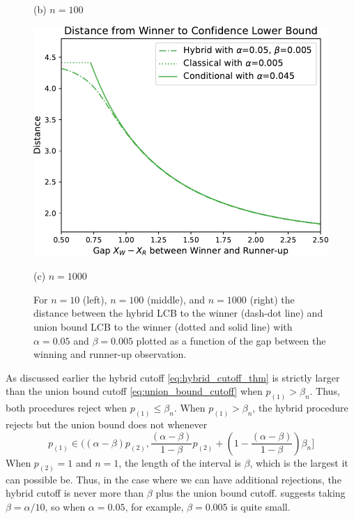 \documentclass{article}
\begin{document}
\begin{appendix}
\begin{figure}
\begin{minipage}{0.32\textwidth}
        \caption*{(b) $n=100$}
    \end{minipage}
    \hfill
    \hspace{0.01\textwidth}
    \begin{minipage}{0.32\textwidth}
        \centering
        \includegraphics[width=\textwidth]{fig/hyb_dist_to_winner_n=1000.pdf}
        \caption*{(c) $n=1000$}
    \end{minipage}
    \caption{ For $n=10$ (left), $n=100$ (middle), and $n=1000$ (right) the distance between the hybrid LCB to the winner (dash-dot line) and union bound LCB to the winner (dotted and solid line) with $\alpha=0.05$ and $\beta=0.005$ plotted as a function of the gap between the winning and runner-up observation.}
    \label{fig:hybrid_union}
\end{figure}

As discussed earlier the hybrid cutoff \eqref{eq:hybrid_cutoff_thm} is strictly larger than the union bound cutoff \eqref{eq:union_bound_cutoff} when $p_{(1)} > \beta_n$. Thus, both procedures reject when $p_{(1)} \leq \beta_n$. When $p_{(1)} > \beta_n$, the hybrid procedure rejects but the union bound does not whenever  
\begin{equation*}
    p_{(1)} \in \bigg((\alpha - \beta)p_{(2)},  \frac{(\alpha - \beta)}{1-\beta}p_{(2)} + \left(1 -  \frac{(\alpha - \beta)}{1-\beta}\right)\beta_n \bigg]
\end{equation*}
When $p_{(2)} = 1$ and $n=1$, the length of the interval is $\beta$, which is the largest it can possible be. Thus, in the case where we can have additional rejections, the hybrid cutoff is never more than $\beta$ plus the union bound cutoff. \cite{Andrews2023} suggests taking $\beta=\alpha/10$, so when $\alpha = 0.05$, for example, $\beta=0.005$ is quite small. 


\end{appendix}
\end{document}
